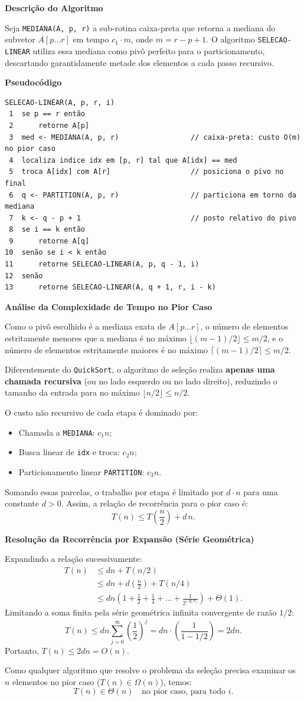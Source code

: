 \documentclass[11pt,a4paper]{article}
\newcommand{\res}[1]{\[\boxed{#1}\]}
\newcommand{\topico}[1]{\par\medskip\textbf{\color{azul}#1}\par}
\begin{document}
\topico{Descrição do Algoritmo}
Seja \texttt{MEDIANA(A, p, r)} a sub-rotina caixa-preta que retorna a mediana do subvetor $A[p \dots r]$ em tempo $c_1 \cdot m$, onde $m = r - p + 1$. O algoritmo \texttt{SELECAO-LINEAR} utiliza essa mediana como pivô perfeito para o particionamento, descartando garantidamente metade dos elementos a cada passo recursivo.

\topico{Pseudocódigo}
\begin{lstlisting}
SELECAO-LINEAR(A, p, r, i)
 1  se p == r então
 2      retorne A[p]
 3  med <- MEDIANA(A, p, r)                 // caixa-preta: custo O(m) no pior caso
 4  localiza indice idx em [p, r] tal que A[idx] == med
 5  troca A[idx] com A[r]                   // posiciona o pivo no final
 6  q <- PARTITION(A, p, r)                 // particiona em torno da mediana
 7  k <- q - p + 1                          // posto relativo do pivo
 8  se i == k então
 9      retorne A[q]
10  senão se i < k então
11      retorne SELECAO-LINEAR(A, p, q - 1, i)
12  senão
13      retorne SELECAO-LINEAR(A, q + 1, r, i - k)
\end{lstlisting}

\topico{Análise da Complexidade de Tempo no Pior Caso}
Como o pivô escolhido é a mediana exata de $A[p \dots r]$, o número de elementos estritamente menores que a mediana é no máximo $\lfloor (m - 1)/2 \rfloor \le m/2$, e o número de elementos estritamente maiores é no máximo $\lceil (m - 1)/2 \rceil \le m/2$.

Diferentemente do \texttt{QuickSort}, o algoritmo de seleção realiza \textbf{apenas uma chamada recursiva} (ou no lado esquerdo ou no lado direito), reduzindo o tamanho da entrada para no máximo $\lfloor n/2 \rfloor \le n/2$.

O custo não recursivo de cada etapa é dominado por:
\begin{itemize}
    \item Chamada a \texttt{MEDIANA}: $c_1 n$;
    \item Busca linear de \texttt{idx} e troca: $c_2 n$;
    \item Particionamento linear \texttt{PARTITION}: $c_3 n$.
\end{itemize}
Somando essas parcelas, o trabalho por etapa é limitado por $d \cdot n$ para uma constante $d > 0$. Assim, a relação de recorrência para o pior caso é:
\[
T(n) \le T\left(\frac{n}{2}\right) + d\,n.
\]

\topico{Resolução da Recorrência por Expansão (Série Geométrica)}
Expandindo a relação sucessivamente:
\begin{align*}
T(n) &\le d n + T(n/2) \\
     &\le d n + d\left(\frac{n}{2}\right) + T(n/4) \\
     &\le d n \left(1 + \frac{1}{2} + \frac{1}{4} + \dots + \frac{1}{2^{\lfloor \lg n \rfloor}}\right) + \Theta(1).
\end{align*}
Limitando a soma finita pela série geométrica infinita convergente de razão $1/2$:
\[
T(n) \le d n \sum_{j=0}^{\infty} \left(\frac{1}{2}\right)^j = d n \cdot \left(\frac{1}{1 - 1/2}\right) = 2 d n.
\]
Portanto, $T(n) \le 2 d n = O(n)$. 

Como qualquer algoritmo que resolve o problema da seleção precisa examinar os $n$ elementos no pior caso ($T(n) \in \Omega(n)$), temos:
\res{T(n) \in \Theta(n) \quad \text{no pior caso, para todo } i.}
\end{document}
